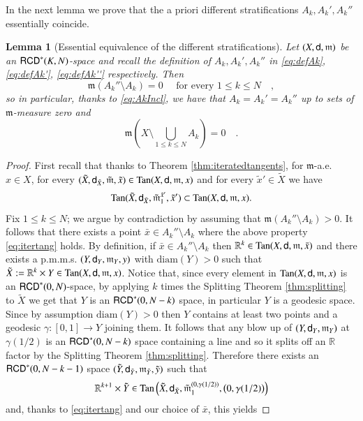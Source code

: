 \documentclass[11pt,reqno]{amsart}
\newcommand{\diam}{\text{diam}}
\newcommand{\mm}{\mathfrak m}
\newcommand{\sfd}{{\sf d}}
\newcommand{\R}{\mathbb{R}}
\newcommand{\Tan}{{\rm Tan}}
\newcommand{\RCD}{{\sf RCD}}
\newtheorem{lemma}[theorem]{Lemma}
\theoremstyle{definition}
\theoremstyle{remark}
\theoremstyle{remark}
\theoremstyle{remark}
\theoremstyle{remark}
\theoremstyle{remark}
\theoremstyle{remark}
\theoremstyle{remark}
\begin{document}
In the next lemma we prove that the a priori  different stratifications $A_k, A_k',A_k''$ essentially coincide.
\begin{lemma}[Essential equivalence of the different stratifications]\label{lem:AkEq}
Let $(X,\sfd,\mm)$ be an $\RCD^*(K,N)$-space and recall the definition of $A_k, A_k', A_k''$ in \eqref{eq:defAk}, \eqref{eq:defAk'}, \eqref{eq:defAk''} respectively.  Then
$$\mm(A_k''\setminus A_k)=0 \quad \text{ for every } 1\leq k \leq N\quad, $$
so in particular, thanks to \eqref{eq:AkIncl}, we have that $A_k=A_k'=A_k''$ up to sets of $\mm$-measure zero and 
$$\mm\left(X\setminus \bigcup_{1\leq k \leq N} A_k\right)=0\quad.$$
\end{lemma}

\begin{proof}
First recall that thanks to Theorem \ref{thm:iteratedtangents}, for $\mm$-a.e. $x \in X$, for every $(\tilde{X},\sfd_{\tilde{X}}, \tilde{\mm},\tilde{x})\in \Tan(X,\sfd,\mm,x)$ and for every $\tilde{x}'\in \tilde{X}$ we have 
\begin{equation}\label{eq:itertang}
\Tan(\tilde{X},\sfd_{\tilde{X}}, \tilde{\mm}_1^{\tilde{x}'},\tilde{x}') \subset  \Tan(X,\sfd,\mm,x).
\end{equation}
Fix $1\leq k \leq N$; we argue by contradiction by assuming that $\mm(A_k''\setminus A_k)>0$.  It follows that   there exists a point $\bar{x}\in A_k''\setminus A_k$ where the above property \eqref{eq:itertang} holds. By definition, if $\bar{x}\in A_k''\setminus A_k$ then $\R^k \in \Tan(X,\sfd,\mm,\bar{x})$ and there exists a p.m.m.s. $(Y,\sfd_Y, \mm_Y,y)$ with $\diam(Y)>0$ such that $\tilde{X}:= \R^k \times Y \in \Tan(X,\sfd,\mm,x)$. Notice that, since every element in $\Tan(X,\sfd,\mm,x)$ is an $\RCD^*(0,N)$-space, by applying $k$ times the Splitting Theorem \ref{thm:splitting} to $\tilde{X}$ we get that $Y$ is an $\RCD^*(0,N-k)$ space, in particular $Y$ is a geodesic space. Since by assumption $\diam(Y)>0$ then $Y$ contains at least two points and a geodesic $\gamma:[0,1]\to Y$ joining them. It follows that any blow up of $(Y, \sfd_Y, \mm_Y)$ at $\gamma(1/2)$ is an $\RCD^*(0,N-k)$ space containing a line and so it splits off an $\R$ factor by the Splitting Theorem \ref{thm:splitting}. Therefore there exists an $\RCD^*(0,N-k-1)$ space $(\tilde{Y},\sfd_{\tilde{Y}}, \mm_{\tilde{Y}},\tilde{y})$ such that 
$$\R^{k+1}\times \tilde{Y} \in \Tan\left(\tilde{X},\sfd_{\tilde{X}}, \tilde{\mm}_1^{(0,\gamma(1/2))}, \big(0,\gamma(1/2)\big) \right)$$
and, thanks to \eqref{eq:itertang} and our choice of $\bar{x}$, this yields

\end{proof}
\end{document}
